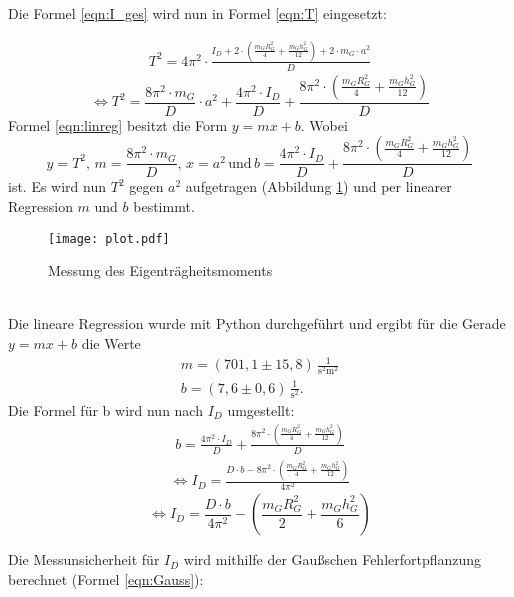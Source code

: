 Die Formel \ref{eqn:I_ges} wird nun in Formel \ref{eqn:T} eingesetzt:

\begin{align*}
  T^2 = 4\pi^2 \cdot \frac{I_D + 2 \cdot \left(\frac{m_G R_G^2}{4} + \frac{m_G h_G^2}{12} \right) + 2 \cdot m_G \cdot a^2}{D}
\end{align*}
\begin{equation}
  \label{eqn:linreg}
  \Leftrightarrow T^2 = \frac{8\pi^2 \cdot m_G}{D}\cdot a^2 + \frac{4\pi^2 \cdot I_D}{D}  + \frac{8\pi^2 \cdot \left(\frac{m_G R_G^2}{4} + \frac{m_G h_G^2}{12} \right)}{D}
\end{equation}
Formel \ref{eqn:linreg} besitzt die Form $y = mx + b$. Wobei 
\begin{equation*}
  y = T^2,\, m = \frac{8\pi^2 \cdot m_G}{D},\, x = a^2 \, \mathrm{und}\, b = \frac{4\pi^2 \cdot I_D}{D}  + \frac{8\pi^2 \cdot \left(\frac{m_G R_G^2}{4} + \frac{m_G h_G^2}{12} \right)}{D}
\end{equation*}
ist. Es wird nun $T^2$ gegen $a^2$ aufgetragen (Abbildung \ref{fig:plot}) und per linearer Regression $m$ und $b$ bestimmt.
 \begin{figure}
   \centering
   \texttt{[image: plot.pdf]}
   \caption{Messung des Eigenträgheitsmoments}
   \label{fig:plot}
 \end{figure}
\\
Die lineare Regression wurde mit Python durchgeführt und ergibt für die Gerade $y = mx + b$ die Werte
\begin{align*}
  m = (701{,}1 \pm 15{,}8)\, \frac{1}{\mathrm{s^2 m^2}} \\
  b = (7{,}6 \pm 0{,}6)\, \frac{1}{\mathrm{s^2}} .
\end{align*}
Die Formel für b wird nun nach $I_D$ umgestellt:
\begin{align*}
  b = \frac{4\pi^2 \cdot I_D}{D}  + \frac{8\pi^2 \cdot \left(\frac{m_G R_G^2}{4} + \frac{m_G h_G^2}{12} \right)}{D}
\end{align*}
\begin{align*}
  \Leftrightarrow I_D = \frac{D \cdot b - 8\pi^2 \cdot \left(\frac{m_G R_G^2}{4} + \frac{m_G h_G^2}{12} \right)}{4\pi^2}
\end{align*}
\begin{equation}
  \label{eqn:I_D}
  \Leftrightarrow I_D = \frac{D \cdot b}{4\pi^2} - \left(\frac{m_G R_G^2}{2} + \frac{m_G h_G^2}{6} \right)
\end{equation}

Die Messunsicherheit für $I_D$ wird mithilfe der Gaußschen Fehlerfortpflanzung berechnet (Formel \ref{eqn:Gauss}):

